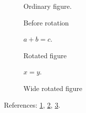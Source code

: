 \documentclass{article}
\begin{document}
\begin{figure}[ht]
  Ordinary figure. \caption{Before rotation}\label{fig:before}
\end{figure}
\begin{figure}
  $a+b=c$. \caption[Short rotated]{Rotated figure}\label{fig:rotated}
\end{figure}
\begin{figure}
  $x=y$. \caption{Wide rotated figure}\label{fig:wide}
\end{figure}
References: \ref{fig:before}, \ref{fig:rotated}, \ref{fig:wide}.
\end{document}
